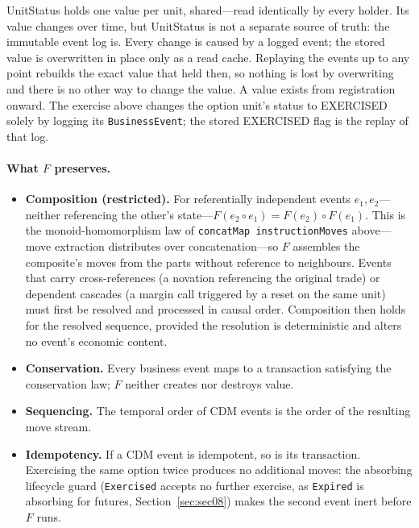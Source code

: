 \begin{remark}
UnitStatus holds one value per unit, shared---read identically by every holder. Its value changes over time, but UnitStatus is not a separate source of truth: the immutable event log is. Every change is caused by a logged event; the stored value is overwritten in place only as a read cache. Replaying the events up to any point rebuilds the exact value that held then, so nothing is lost by overwriting and there is no other way to change the value. A value exists from registration onward. The exercise above changes the option unit's status to EXERCISED solely by logging its \texttt{BusinessEvent}; the stored EXERCISED flag is the replay of that log.
\end{remark}

\paragraph{What \texorpdfstring{$F$}{F} preserves.}
\begin{itemize}[nosep]
\item \textbf{Composition (restricted).} For referentially independent events $e_1, e_2$---neither referencing the other's state---$F(e_2 \circ e_1) = F(e_2) \circ F(e_1)$. This is the monoid-homomorphism law of \texttt{concatMap instructionMoves} above---move extraction distributes over concatenation---so $F$ assembles the composite's moves from the parts without reference to neighbours. Events that carry cross-references (a novation referencing the original trade) or dependent cascades (a margin call triggered by a reset on the same unit) must first be resolved and processed in causal order. Composition then holds for the resolved sequence, provided the resolution is deterministic and alters no event's economic content.
\item \textbf{Conservation.} Every business event maps to a transaction satisfying the conservation law; $F$ neither creates nor destroys value.
\item \textbf{Sequencing.} The temporal order of CDM events is the order of the resulting move stream.
\item \textbf{Idempotency.} If a CDM event is idempotent, so is its transaction. Exercising the same option twice produces no additional moves: the absorbing lifecycle guard (\texttt{Exercised} accepts no further exercise, as \texttt{Expired} is absorbing for futures, Section~\ref{sec:sec08}) makes the second event inert before $F$ runs.
\end{itemize}

